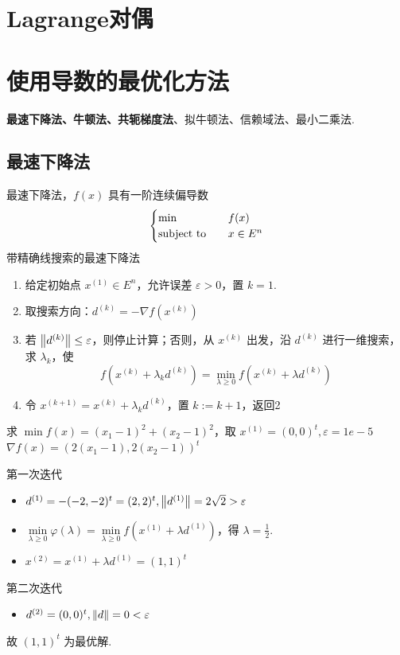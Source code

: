 \section{Lagrange对偶}

\section{使用导数的最优化方法}
\textbf{最速下降法、牛顿法、共轭梯度法}、拟牛顿法、信赖域法、最小二乘法.

\subsection{最速下降法}
\begin{remark}
    最速下降法，$f(x)$ 具有一阶连续偏导数 \[\begin{cases}
        \min \quad &f(x)\\
        \operatorname{subject\ to} \quad &x \in E^n
    \end{cases}\]
    带精确线搜索的最速下降法 \begin{enumerate}
        \item 给定初始点 $x^{(1)} \in E^n$，允许误差 $\varepsilon > 0$，置 $k = 1$.
        \item 取搜索方向：$d^{(k)} = -\nabla f(x^{(k)})$
        \item 若 $\norm{d^{(k)}} \le \varepsilon$，则停止计算；否则，从 $x^{(k)}$ 出发，沿 $d^{(k)}$ 进行一维搜索，求 $\lambda_k$，使 \[f(x^{(k)} + \lambda_k d^{(k)}) = \min_{\lambda \ge 0} f(x^{(k)} + \lambda d^{(k)})\]
        \item 令 $x^{(k + 1)} = x^{(k)} + \lambda_k d^{(k)}$，置 $k := k + 1$，返回2
    \end{enumerate}
\end{remark}

\begin{example}
    求 $\min f(x) = (x_1 - 1)^2 + (x_2 - 1)^2$，取 $x^{(1)} = (0, 0)^t, \varepsilon = 1e-5$
    \Answer $\nabla f(x) = (2(x_1 - 1), 2(x_2 - 1))^t$

    第一次迭代\begin{itemize}
        \item $d^{(1)} = -(-2, -2)^t = (2, 2)^t, \norm{d^{(1)}} = 2\sqrt{2} > \varepsilon$
        \item $\underset{\lambda \ge 0}{\min} \varphi(\lambda) = \underset{\lambda \ge 0}{\min} f(x^{(1)} + \lambda d^{(1)})$，得 $\lambda = \frac{1}{2}$.
        \item $x^{(2)} = x^{(1)} + \lambda d^{(1)} = (1, 1)^t$
    \end{itemize}
    第二次迭代\begin{itemize}
        \item $d^{(2)} = (0, 0)^t, \norm{d} = 0 < \varepsilon$
    \end{itemize}
    故 $(1, 1)^t$ 为最优解.
\end{example}

